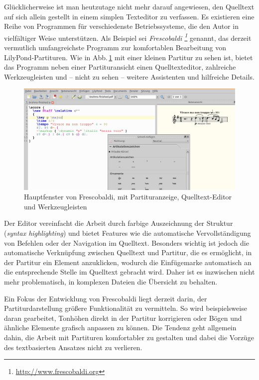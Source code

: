 \documentclass[DIV=12]{scrreprt}
\begin{document}
\bigskip
Glücklicherweise ist man heutzutage nicht mehr darauf angewiesen, den Quelltext auf sich allein gestellt in einem simplen Texteditor zu verfassen.
Es existieren eine Reihe von Programmen für verschiedenste Betriebssysteme, die den Autor in vielfältiger Weise unterstützen.
Als Beispiel sei \textit{Frescobaldi%
\footnote{\url{http://www.frescobaldi.org}}}
genannt, das derzeit vermutlich umfangreichste Programm zur komfortablen Bearbeitung von LilyPond-Partituren.
Wie in Abb.\,\ref{fig:pt_fb-main-window} mit einer kleinen Partitur zu sehen ist, bietet das Programm neben einer Partituransicht einen Quelltexteditor, zahlreiche Werkzeugleisten und -- nicht zu sehen -- weitere Assistenten und hilfreiche Details.
	\begin{figure}
	\includegraphics[max width=\textwidth]{examples/frescobaldi-main}
	\caption{Hauptfenster von Frescobaldi, mit Partituranzeige, Quelltext-Editor und Werkzeugleisten}
	\label{fig:pt_fb-main-window}
	\end{figure}
Der Editor vereinfacht die Arbeit durch farbige Auszeichnung der Struktur (\emph{syntax highlighting}) und bietet Features wie die automatische Vervollständigung von Befehlen oder der Navigation im Quelltext.
Besonders wichtig ist jedoch die automatische Verknüpfung zwischen Quelltext und Partitur, die es ermöglicht, in der Partitur ein Element anzuklicken, wodurch die Einfügemarke automatisch an die entsprechende Stelle im Quelltext gebracht wird.
Daher ist es inzwischen nicht mehr problematisch, in komplexen Dateien die Übersicht zu behalten.

Ein Fokus der Entwicklung von Frescobaldi liegt derzeit darin, der Partiturdarstellung größere Funktionalität zu vermitteln.
So wird beispielsweise daran gearbeitet, Tonhöhen direkt in der Partitur  korrigieren oder Bögen und ähnliche Elemente grafisch anpassen zu können.
Die Tendenz geht allgemein dahin, die Arbeit mit Partituren komfortabler zu gestalten und dabei die Vorzüge des textbasierten Ansatzes nicht zu verlieren.
\end{document}
